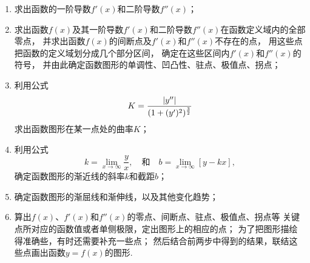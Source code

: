 \begin{enumerate}
	\item 求出函数的一阶导数\(f'(x)\)和二阶导数\(f''(x)\)；

	\item 求出函数\(f(x)\)及其一阶导数\(f'(x)\)和二阶导数\(f''(x)\)在函数定义域内的全部零点，
	并求出函数\(f(x)\)的间断点及\(f'(x)\)和\(f''(x)\)不存在的点，
	用这些点把函数的定义域划分成几个部分区间，
	确定在这些区间内\(f'(x)\)和\(f''(x)\)的符号，
	并由此确定函数图形的单调性、凹凸性、驻点、极值点、拐点；

	\item 利用公式\[
		K = \frac{\abs{y''}}{(1+(y')^2)^{\frac32}}
	\]求出函数图形在某一点处的曲率\(K\)；

	\item 利用公式\[
		k = \lim_{x\to\infty} \frac{y}{x},
		\quad\text{和}\quad
		b = \lim_{x\to\infty} \left[y - kx\right],
	\]确定函数图形的渐近线的斜率\(k\)和截距\(b\)；

	\item 确定函数图形的渐屈线和渐伸线，以及其他变化趋势；

	\item 算出\(f(x)\)、\(f'(x)\)和\(f''(x)\)的零点、间断点、驻点、极值点、拐点等
	关键点所对应的函数值或者单侧极限，定出图形上的相应的点；
	为了把图形描绘得准确些，有时还需要补充一些点；
	然后结合前两步中得到的结果，联结这些点画出函数\(y=f(x)\)的图形.
\end{enumerate}
